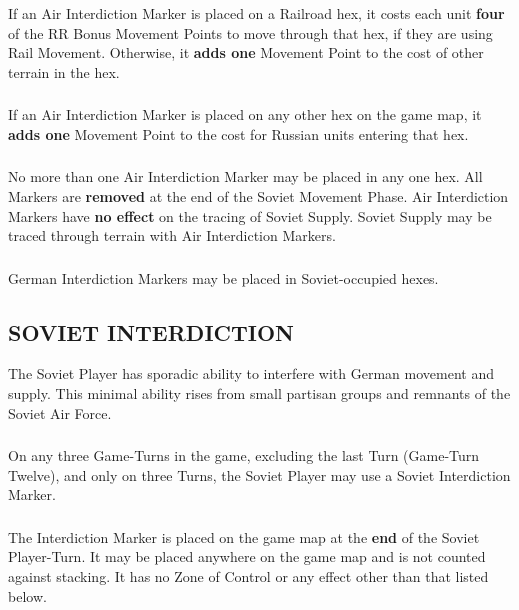 \subsubsection{} If an Air Interdiction Marker is placed on a Railroad hex, it costs each unit \textbf{four} of the RR Bonus Movement Points to move through that hex, if they are using Rail Movement. Otherwise, it \textbf{adds one} Movement Point to the cost of other terrain in the hex.

\subsubsection{} If an Air Interdiction Marker is placed on any other hex on the game map, it \textbf{adds one} Movement Point to the cost for Russian units entering that hex.

\subsubsection{} No more than one Air Interdiction Marker may be placed in any one hex. All Markers are \textbf{removed} at the end of the Soviet Movement Phase. Air Interdiction Markers have \textbf{no effect} on the tracing of Soviet Supply. Soviet Supply may be traced through terrain with Air Interdiction Markers.

\subsubsection{} German Interdiction Markers may be placed in Soviet-occupied hexes.

\subsection{SOVIET INTERDICTION}

The Soviet Player has sporadic ability to interfere with German movement and supply. This minimal ability rises from small partisan groups and remnants of the Soviet Air Force.

\subsubsection{} On any three Game-Turns in the game, excluding the last Turn (Game-Turn Twelve), and only on three Turns, the Soviet Player may use a Soviet Interdiction Marker.

\subsubsection{} The Interdiction Marker is placed on the game map at the \textbf{end} of the Soviet Player-Turn. It may be placed anywhere on the game map and is not counted against stacking. It has no Zone of Control or any effect other than that listed below.

